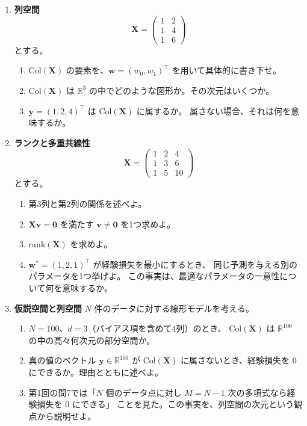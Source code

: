 \begin{enumerate}
  \item \textbf{列空間}\quad
    \begin{equation*}
      \bm{X} = \begin{pmatrix} 1 & 2 \\ 1 & 4 \\ 1 & 6 \end{pmatrix}
    \end{equation*}
    とする。
    \begin{enumerate}
      \item $\mathrm{Col}(\bm{X})$ の要素を、$\bm{w} = (w_0, w_1)^\top$ を用いて具体的に書き下せ。
      \item $\mathrm{Col}(\bm{X})$ は $\mathbb{R}^3$ の中でどのような図形か。その次元はいくつか。
      \item $\bm{y} = (1, 2, 4)^\top$ は $\mathrm{Col}(\bm{X})$ に属するか。
        属さない場合、それは何を意味するか。
    \end{enumerate}

  \item \textbf{ランクと多重共線性}\quad
    \begin{equation*}
      \bm{X} = \begin{pmatrix} 1 & 2 & 4 \\ 1 & 3 & 6 \\ 1 & 5 & 10 \end{pmatrix}
    \end{equation*}
    とする。
    \begin{enumerate}
      \item 第3列と第2列の関係を述べよ。
      \item $\bm{X}\bm{v} = \bm{0}$ を満たす $\bm{v} \neq \bm{0}$ を1つ求めよ。
      \item $\mathrm{rank}(\bm{X})$ を求めよ。
      \item $\bm{w}^* = (1, 2, 1)^\top$ が経験損失を最小にするとき、
        同じ予測を与える別のパラメータを1つ挙げよ。
        この事実は、最適なパラメータの一意性について何を意味するか。
    \end{enumerate}

  \item \textbf{仮説空間と列空間}\quad
    $N$ 件のデータに対する線形モデルを考える。
    \begin{enumerate}
      \item $N = 100$、$d = 3$（バイアス項を含めて4列）のとき、
        $\mathrm{Col}(\bm{X})$ は $\mathbb{R}^{100}$ の中の高々何次元の部分空間か。
      \item 真の値のベクトル $\bm{y} \in \mathbb{R}^{100}$ が
        $\mathrm{Col}(\bm{X})$ に属さないとき、経験損失を $0$ にできるか。理由とともに述べよ。
      \item 第1回の問7では「$N$ 個のデータ点に対し $M = N-1$ 次の多項式なら経験損失を $0$ にできる」
        ことを見た。この事実を、列空間の次元という観点から説明せよ。
    \end{enumerate}


\end{enumerate}
